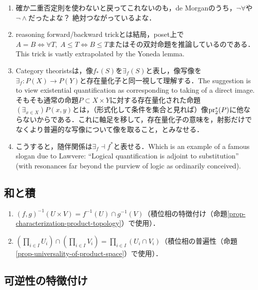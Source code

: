 \documentclass[uplatex,dvipdfmx]{jsreport}
\begin{document}
\begin{remarks}\mbox{}
    \begin{enumerate}
        \item 確か二重否定則を使わないと戻ってこれないのも，de Morganのうち，$\lnot\forall$や$\lnot\land$だったよな？
        絶対つながっているよな．
        \item reasoning forward/backward trickとは結局，poset上で$A=B\iff\forall T,\;A\le T\Leftrightarrow B\le T$またはその双対命題を推論しているのである．This trick is vastly extrapolated by the Yoneda lemma.
        \item Category theoristsは，像$f_*(S)$を$\exists_f(S)$と表し，像写像を$\exists_f:P(X)\to P(Y)$と存在量化子と同一視して理解する．The suggestion is to view existential quantification as corresponding to taking of a direct image. そもそも通常の命題$P\subset X\times Y$に対する存在量化された命題$(\exists_{x\in X}) P(x,y)$とは，（形式化して条件を集合と見れば）像$\mathrm{pr}_2^*(P)$に他ならないからである．これに軸足を移して，存在量化子の意味を，射影だけでなくより普遍的な写像について像を取ること，とみなせる．
        \item こうすると，随伴関係は$\exists_f\dashv f^*$と表せる．Which is an example of a famous slogan due to Lawvere: “Logical quantification is adjoint to substitution” (with resonances far beyond the purview of logic as ordinarily conceived).
    \end{enumerate}
\end{remarks}

\subsection{和と積}

\begin{lemma}\mbox{}\label{lemma-preimage-and-product}
    \begin{enumerate}
        \item $(f,g)^{-1}(U\times V)=f^{-1}(U)\cap g^{-1}(V)$（積位相の特徴付け（命題\ref{prop-characterization-product-topology}）で使用）．
        \item $(\prod_{i\in I}U_i)\cap(\prod_{i\in I}V_i)=\prod_{i\in I}(U_i\cap V_i)$（積位相の普遍性（命題\ref{prop-universality-of-product-space}）で使用）．
    \end{enumerate}
\end{lemma}

\subsection{可逆性の特徴付け}
\end{document}
